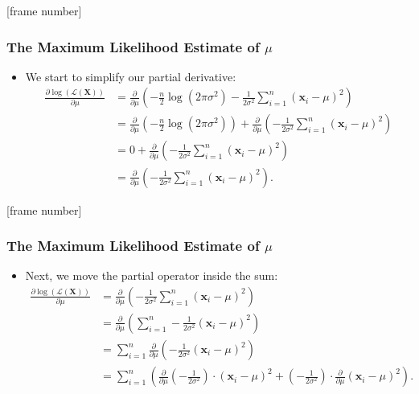 \documentclass[aspectratio=169,t,xcolor=dvipsnames]{beamer}
\begin{document}
{
[frame number]
\begin{frame}
	\frametitle{The Maximum Likelihood Estimate of $\mu$}
	\begin{itemize}
		\item We start to simplify our partial derivative:
    \begin{align}
      \frac{\partial \log\left(\mathcal{L}(\mathbf{X})\right)}{\partial \mu} &= \frac{\partial}{\partial\mu} \left( - \frac{n}{2} \log\left(2\pi\sigma^2\right) -\frac{1}{2\sigma^2} \sum_{i=1}^{n} (\mathbf{x}_i-\mu)^2 \right)\\
      &= \frac{\partial}{\partial\mu} \left( - \frac{n}{2} \log\left(2\pi\sigma^2\right)\right) + \frac{\partial}{\partial\mu}\left(-\frac{1}{2\sigma^2} \sum_{i=1}^{n} (\mathbf{x}_i-\mu)^2 \right)\\
      &= 0 + \frac{\partial}{\partial\mu}\left(-\frac{1}{2\sigma^2} \sum_{i=1}^{n} (\mathbf{x}_i-\mu)^2 \right)\\
      &= \frac{\partial}{\partial\mu}\left(-\frac{1}{2\sigma^2} \sum_{i=1}^{n} (\mathbf{x}_i-\mu)^2 \right).
    \end{align}
	\end{itemize}
\end{frame}
}

{
[frame number]
\begin{frame}
	\frametitle{The Maximum Likelihood Estimate of $\mu$}
	\begin{itemize}
		\item Next, we move the partial operator inside the sum:
    \begin{align}
      \frac{\partial \log\left(\mathcal{L}(\mathbf{X})\right)}{\partial \mu} &= \frac{\partial}{\partial\mu}\left(-\frac{1}{2\sigma^2} \sum_{i=1}^{n} (\mathbf{x}_i-\mu)^2 \right) \\
      &= \frac{\partial}{\partial\mu}\left(\sum_{i=1}^{n}-\frac{1}{2\sigma^2} (\mathbf{x}_i-\mu)^2 \right)\\
      &= \sum_{i=1}^{n} \frac{\partial}{\partial\mu}\left(-\frac{1}{2\sigma^2} (\mathbf{x}_i-\mu)^2\right)\\
      &= \sum_{i=1}^{n} \left(\frac{\partial}{\partial\mu}\left(-\frac{1}{2\sigma^2}\right) \cdot (\mathbf{x}_i - \mu)^2 + \left( - \frac{1}{2\sigma^2} \right) \cdot \frac{\partial}{\partial\mu} (\mathbf{x}_i-\mu)^2\right).
    \end{align}
	\end{itemize}
\end{frame}
}
\end{document}
